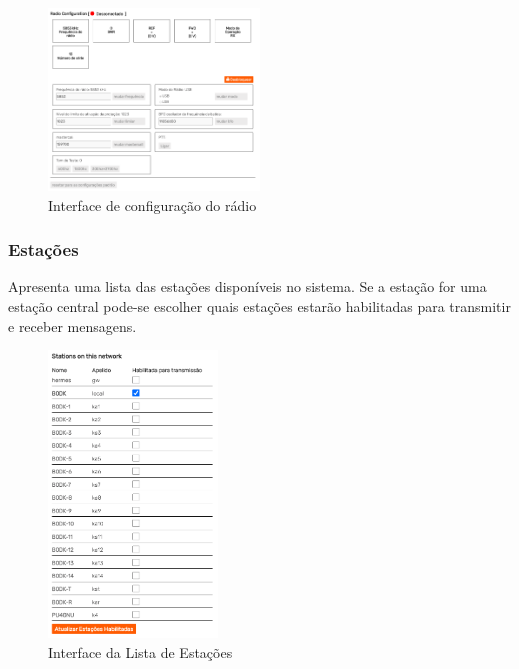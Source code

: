 \documentclass[11pt,a4paper]{article}
\begin{document}
\begin{figure}[H]
    \centering
    \includegraphics[width=0.5\textwidth]{screenshots/frontend/pt_kn/radioconfig.png}
    \caption{Interface de configuração do rádio}
	\vspace{-10pt}
    \label{fig:radioconf}
\end{figure}    


\subsubsection{Estações} 
\label{gui_stations}

Apresenta uma lista das estações disponíveis no sistema. Se a estação for uma estação central pode-se escolher quais estações estarão habilitadas para transmitir e receber mensagens. 

\begin{figure}[H]
    \centering
    \includegraphics[width=0.4\textwidth]{screenshots/frontend/pt_kn/stations.png}
    \caption{Interface da Lista de Estações}
	\vspace{-10pt}
    \label{fig:stations}
\end{figure} 
\end{document}
